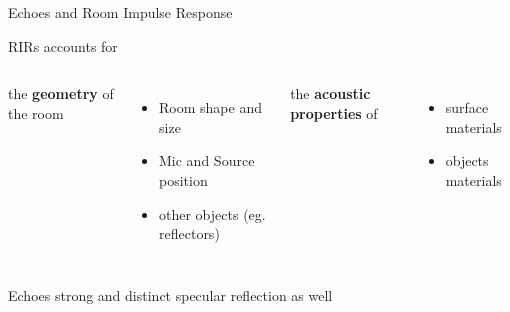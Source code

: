 \begin{frame}{Echoes and Room Impulse Response}
    \vfill
    \begin{block}{RIRs accounts for}

        \vspace{3mm}
        \begin{columns}[T,onlytextwidth]
            the \textbf{geometry} of the room
            \begin{itemize}
                \item \alert{Room shape and size}
                \item \alert{Mic and Source position}
                \item other objects (eg. reflectors)
            \end{itemize}
            the \textbf{acoustic properties} of
            \begin{itemize}
                \item surface materials
                \item objects materials
            \end{itemize}
        \end{columns}
    \end{block}

    \begin{center}
        \alert{Echoes} strong and distinct specular reflection as well
    \end{center}

\end{frame}




